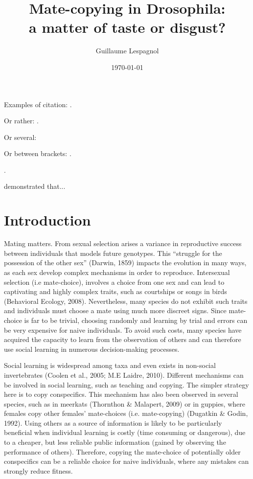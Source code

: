 \documentclass[a4paper, 12pt]{article}
\title{\Huge Mate-copying in Drosophila:\\ a matter of taste or disgust?}
\author{Guillaume Lespagnol}
\date{\today}
\begin{document}
	
	\maketitle
	
	\tableofcontents
	\bigskip
	
	Examples of citation: \textcite[e.g.][118]{danchin_cultural_2018}.
	
	Or rather:
	\parencite[e.g.][118]{danchin_cultural_2018}.
	
	Or several: \textcites[e.g.][118]{danchin_cultural_2018}[but see][1789]{pike_conformist_2010}
	
	Or between brackets: \parencites[e.g.][118]{danchin_cultural_2018}[but see][1789]{pike_conformist_2010}.
	
	\parencite{framit_zotero_2019, morgan_biological_2012}.
	
	\textcite{dagaeff_drosophila_2016} demonstrated that...
	
	\section{Introduction}

	Mating matters. From sexual selection arises a variance in reproductive success between individuals that models future genotypes. This “struggle for the possession of the other sex” (Darwin, 1859) impacts the evolution in many ways, as each sex develop complex mechanisms in order to reproduce. Intersexual selection (i.e mate-choice), involves a choice from one sex and can lead to captivating and highly complex traits, such as courtships or songs in birds (Behavioral Ecology, 2008). Nevertheless, many species do not exhibit such traits and individuals must choose a mate using much more discreet signs. Since mate-choice is far to be trivial, choosing randomly and learning by trial and errors can be very expensive for naive individuals. To avoid such costs, many species have acquired the capacity to learn from the observation of others and can therefore use social learning in numerous decision-making processes.
	
	Social learning is widespread among taxa and even exists in non-social invertebrates (Coolen et al., 2005; M.E Laidre, 2010). Different mechanisms can be involved in social learning, such as teaching and copying. The simpler strategy here is to copy conspecifics. This mechanism has also been observed in several species, such as in meerkats (Thornthon \& Malapert, 2009) or in guppies, where females copy other females’ mate-choices (i.e. mate-copying) (Dugatkin \& Godin, 1992). Using others as a source of information is likely to be particularly beneficial when individual learning is costly (time consuming or dangerous), due to a cheaper, but less reliable public information (gained by observing the performance of others). Therefore, copying the mate-choice of potentially older conspecifics can be a reliable choice for naive individuals, where any mistakes can strongly reduce fitness.
	
\end{document}
